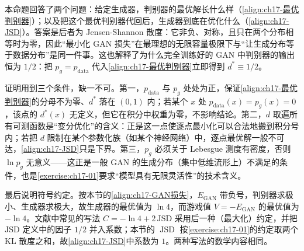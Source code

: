 \documentclass[../../main.tex]{subfiles}
\begin{document}
\begin{remark}
本命题回答了两个问题：给定生成器，判别器的最优解长什么样（\eqref{align:ch17-最优判别器}）；以及把这个最优判别器代回后，生成器到底在优化什么（\eqref{align:ch17-JSD}）。答案是后者为 Jensen-Shannon 散度：它非负、对称，且只在两个分布相等时为零，因此“最小化 GAN 损失”在最理想的无限容量极限下与“让生成分布等于数据分布”是同一件事。这也解释了为什么完全训练好的 GAN 中判别器的输出恒为 $1/2$：把 $p_g=p_{\mathrm{data}}$ 代入\eqref{align:ch17-最优判别器}立即得到 $d^*\equiv1/2$。

证明用到三个条件，缺一不可。第一，$p_{\mathrm{data}}$ 与 $p_g$ 处处为正，保证\eqref{align:ch17-最优判别器}的分母不为零、$d^*$ 落在 $(0,1)$ 内；若某个 $x$ 处 $p_{\mathrm{data}}(x)=p_g(x)=0$，该点的 $d^*(x)$ 无定义，但它在积分中权重为零，不影响结论。第二，$d$ 取遍所有可测函数是“变分优化”的含义：正是这一点使逐点最小化可以合法地搬到积分号内；若把 $d$ 限制在某个参数化族（如某个神经网络）中，逐点最优解一般不可达，\eqref{align:ch17-JSD}只是下界。第三，$p_g$ 必须关于 Lebesgue 测度有密度，否则 $\ln p_g$ 无意义——这正是一般 GAN 的生成分布（集中低维流形上）不满足的条件，也是\cref{exercise:ch17-01}要求“模型具有无限灵活性”的技术含义。

最后说明符号约定。按本节的\eqref{align:ch17-GAN损失}，$E_{\mathrm{GAN}}$ 带负号，判别器求极小、生成器求极大，故生成器的最优值为 $\ln4$，而游戏值 $V=-E_{\mathrm{GAN}}$ 的最优值为 $-\ln4$。文献中常见的写法 $C=-\ln4+2\,\mathrm{JSD}$ 采用后一种（最大化）约定，并把 $\mathrm{JSD}$ 定义中的因子 $1/2$ 并入系数；本节的 $\operatorname{JSD}$ 按\cref{exercise:ch17-01}的约定取两个 KL 散度之和，故\eqref{align:ch17-JSD}中系数为 $1$。两种写法的数学内容相同。
\end{remark}
\end{document}
